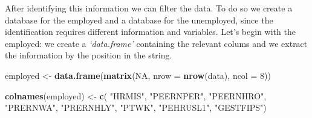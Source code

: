 \documentclass[]{book}
\newenvironment{Shaded}{\begin{snugshade}}{\end{snugshade}}
\newcommand{\KeywordTok}[1]{\textcolor[rgb]{0.13,0.29,0.53}{\textbf{#1}}}
\newcommand{\DataTypeTok}[1]{\textcolor[rgb]{0.13,0.29,0.53}{#1}}
\newcommand{\DecValTok}[1]{\textcolor[rgb]{0.00,0.00,0.81}{#1}}
\newcommand{\StringTok}[1]{\textcolor[rgb]{0.31,0.60,0.02}{#1}}
\newcommand{\OtherTok}[1]{\textcolor[rgb]{0.56,0.35,0.01}{#1}}
\newcommand{\NormalTok}[1]{#1}
\begin{document}
After identifying this information we can filter the data. To do so we
create a database for the employed and a database for the unemployed,
since the identification requires different information and variables.
Let's begin with the employed: we create a \emph{`data.frame'}
containing the relevant colums and we extract the information by the
position in the string.

\begin{Shaded}
\begin{Highlighting}[]
\NormalTok{employed <-}\StringTok{ }\KeywordTok{data.frame}\NormalTok{(}\KeywordTok{matrix}\NormalTok{(}\OtherTok{NA}\NormalTok{, }\DataTypeTok{nrow =} \KeywordTok{nrow}\NormalTok{(data), }\DataTypeTok{ncol =} \DecValTok{8}\NormalTok{))}

\KeywordTok{colnames}\NormalTok{(employed) <-}\StringTok{ }\KeywordTok{c}\NormalTok{(  }\StringTok{"HRMIS"}\NormalTok{,}
                          \StringTok{"PEERNPER"}\NormalTok{,}
                          \StringTok{"PEERNHRO"}\NormalTok{,}
                          \StringTok{"PRERNWA"}\NormalTok{,}
                          \StringTok{"PRERNHLY"}\NormalTok{,}
                          \StringTok{"PTWK"}\NormalTok{,}
                          \StringTok{"PEHRUSL1"}\NormalTok{,}
                          \StringTok{"GESTFIPS"}\NormalTok{)}


\end{Highlighting}
\end{Shaded}
\end{document}

